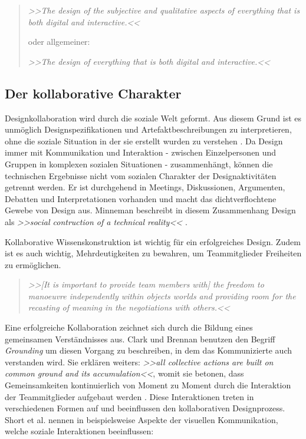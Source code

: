 \begin{quote}
	\textsl{>>The design of the subjective and qualitative aspects of everything that is both digital and interactive.<<}
	
	\smallskip oder allgemeiner: 
	\smallskip
	
	\textsl{>>The design of everything that is both digital and interactive.<<}
\begin{flushright}\citep{Moggridge:2007}\end{flushright}
\end{quote}

\subsection{Der kollaborative Charakter}
Designkollaboration wird durch die soziale Welt geformt. Aus diesem Grund ist es unmöglich Designspezifikationen und Artefaktbeschreibungen zu interpretieren, ohne die soziale Situation in der sie erstellt wurden zu verstehen \citep{Brown:2002}. Da Design immer mit Kommunikation und Interaktion - zwischen Einzelpersonen und Gruppen in komplexen sozialen Situationen - zusammenhängt, können die technischen Ergebnisse nicht vom sozialen Charakter der Designaktivitäten getrennt werden. Er ist durchgehend in Meetings, Diskussionen, Argumenten, Debatten und Interpretationen vorhanden und macht das dichtverflochtene Gewebe von Design aus. Minneman beschreibt in diesem Zusammenhang Design als \emph{>>social contruction of a technical reality<<} \citep{Minneman:1991}.

\medskip Kollaborative Wissenskonstruktion ist wichtig für ein erfolgreiches Design. Zudem ist es auch wichtig, Mehrdeutigkeiten zu bewahren, um Teammitglieder Freiheiten zu ermöglichen.

\begin{quote}
	\textsl{>>[It is important to provide team members with] the freedom to manoeuvre independently within objects worlds and providing room for the recasting of meaning in the negotiations with others.<<}
\begin{flushright}\citep{Bucciarelli:1994}\end{flushright}
\end{quote}

\medskip Eine erfolgreiche Kollaboration zeichnet sich durch die Bildung eines gemeinsamen Verständnisses aus. Clark und Brennan benutzen den Begriff \emph{Grounding} um diesen Vorgang zu beschreiben, in dem das Kommunizierte auch verstanden wird. Sie erklären weiters: \emph{>>all collective actions are built on common ground and its accumulation<<}, womit sie betonen, dass Gemeinsamkeiten kontinuierlich von Moment zu Moment durch die Interaktion der Teammitglieder aufgebaut werden \citep{Clark:1991}. Diese Interaktionen treten in verschiedenen Formen auf und beeinflussen den kollaborativen Designprozess. Short et al. nennen in \citep{Short:1991} beispielsweise Aspekte der visuellen Kommunikation, welche soziale Interaktionen beeinflussen: 

